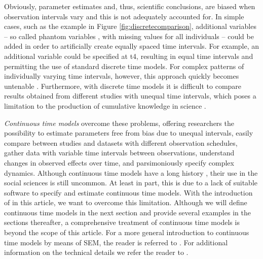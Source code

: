 \documentclass[nojss]{jss}\usepackage[]{graphicx}\usepackage[]{color}
\begin{document}
Obviously, parameter estimates and, thus, scientific conclusions, are biased when observation intervals vary and this is not adequately accounted for. In simple cases, such as the example in Figure \ref{fig:discretecomparison}, additional variables -- so called phantom variables \citep{rindskopf1984using}, with missing values for all individuals -- could be added in order to artificially create equally spaced time intervals. For example, an additional variable could be specified at t4, resulting in equal time intervals and permitting the use of standard discrete time models. For complex patterns of individually varying time intervals, however, this approach quickly becomes untenable \citep{voelkle2013continuous}. Furthermore, with discrete time models it is difficult to compare results obtained from different studies with unequal time intervals, which poses a limitation to the production of cumulative knowledge in science \citep{voelkle2012sem}.

\textit{Continuous time models} overcome these problems, offering researchers the possibility to estimate parameters free from bias due to unequal intervals, easily compare between studies and datasets with different observation schedules, gather data with variable time intervals between observations, understand changes in observed effects over time, and parsimoniously specify complex dynamics. Although continuous time models have a long history \citep{coleman1964introduction, hannan1979methods}, their use in the social sciences is still uncommon. At least in part, this is due to a lack of suitable software to specify and estimate continuous time models. With the introduction of  in this article, we want to overcome this limitation. Although we will define continuous time models in the next section and provide several examples in the sections thereafter, a comprehensive treatment of continuous time models is beyond the scope of this article. For a more general introduction to continuous time models by means of SEM, the reader is referred to \citet{voelkle2012sem}. For additional information on the technical details we refer the reader to \citet{oud2000continuous}. 

\end{document}
